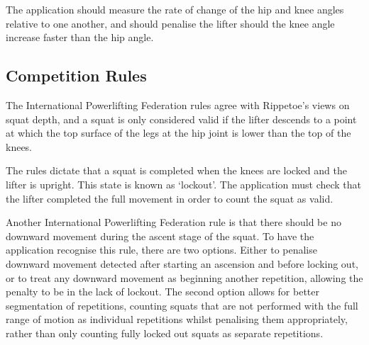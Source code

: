 The application should measure the rate of change of the hip and knee angles relative to one another, and should penalise the lifter should the knee angle increase faster than the hip angle.

\subsection{Competition Rules}

The International Powerlifting Federation rules\cite{ipf} agree with Rippetoe's views on squat depth, and a squat is only considered valid if the lifter descends to a point at which the top surface of the legs at the hip joint is lower than the top of the knees.

The rules dictate that a squat is completed when the knees are locked and the lifter is upright. This state is known as `lockout'. The application must check that the lifter completed the full movement in order to count the squat as valid.

Another International Powerlifting Federation rule is that there should be no downward movement during the ascent stage of the squat. To have the application recognise this rule, there are two options. Either to penalise downward movement detected after starting an ascension and before locking out, or to treat any downward movement as beginning another repetition, allowing the penalty to be in the lack of lockout. The second option allows for better segmentation of repetitions, counting squats that are not performed with the full range of motion as individual repetitions whilst penalising them appropriately, rather than only counting fully locked out squats as separate repetitions.